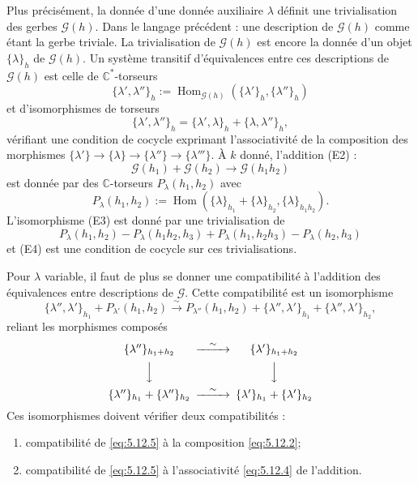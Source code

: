 \documentclass[12pt,a4paper]{article}
\theoremstyle{plain}
\theoremstyle{definition}
\theoremstyle{remark}
\DeclareMathOperator{\Hom}{Hom}
\newcommand{\C}{\mathbb{C}}
\providecommand{\Hom}{\operatorname{Hom}}
\begin{document}
Plus précisément, la donnée d'une donnée auxiliaire $\lambda$ définit une trivialisation
des gerbes $\mathscr{G}(h)$. Dans le langage précédent : une description de $\mathscr{G}(h)$ comme étant la
gerbe triviale. La trivialisation de $\mathscr{G}(h)$ est encore la donnée d'un objet $\{\lambda\}_h$ de $\mathscr{G}(h)$.
Un système transitif d'équivalences entre ces descriptions de $\mathscr{G}(h)$ est celle de $\C^*$-torseurs
\begin{equation}\label{eq:5.12.1}
\{\lambda', \lambda''\}_h := \Hom_{\mathscr{G}(h)}(\{\lambda'\}_h, \{\lambda''\}_h)
\end{equation}
et d'isomorphismes de torseurs
\begin{equation}\label{eq:5.12.2}
\{\lambda', \lambda''\}_h = \{\lambda', \lambda\}_h + \{\lambda, \lambda''\}_h,
\end{equation}
vérifiant une condition de cocycle exprimant l'associativité de la composition des morphismes $\{\lambda'\} \to \{\lambda\} \to \{\lambda''\} \to \{\lambda'''\}$. À $k$ donné, l'addition (E2) :
\[
\mathscr{G}(h_1) + \mathscr{G}(h_2) \to \mathscr{G}(h_1 h_2)
\]
est donnée par des $\C$-torseurs $P_\lambda(h_1, h_2)$ avec
\begin{equation}\label{eq:5.12.3}
P_\lambda(h_1, h_2) := \Hom(\{\lambda\}_{h_1} + \{\lambda\}_{h_2}, \{\lambda\}_{h_1 h_2}).
\end{equation}
L'isomorphisme (E3) est donné par une trivialisation de
\begin{equation}\label{eq:5.12.4}
P_\lambda(h_1, h_2) - P_\lambda(h_1 h_2, h_3) + P_\lambda(h_1, h_2 h_3) - P_\lambda(h_2, h_3)
\end{equation}
et (E4) est une condition de cocycle sur ces trivialisations.

Pour $\lambda$ variable, il faut de plus se donner une compatibilité à l'addition des équivalences entre descriptions de $\mathscr{G}$. Cette compatibilité est un isomorphisme
\begin{equation}\label{eq:5.12.5}
\{\lambda'', \lambda'\}_{h_1} + P_{\lambda'}(h_1, h_2) \xrightarrow{\sim} P_{\lambda''}(h_1, h_2) + \{\lambda'', \lambda'\}_{h_1} + \{\lambda'', \lambda'\}_{h_2},
\end{equation}
reliant les morphismes composés
\[
\begin{CD}
\{\lambda''\}_{h_1 + h_2} @>{\sim}>> \{\lambda'\}_{h_1 + h_2} \\
@VVV @VVV \\
\{\lambda''\}_{h_1} + \{\lambda''\}_{h_2} @>{\sim}>> \{\lambda'\}_{h_1} + \{\lambda'\}_{h_2}
\end{CD}
\]
Ces isomorphismes doivent vérifier deux compatibilités :
\begin{enumerate}[label=\alph*)]
\item compatibilité de \eqref{eq:5.12.5} à la composition \eqref{eq:5.12.2};
\item compatibilité de \eqref{eq:5.12.5} à l'associativité \eqref{eq:5.12.4} de l'addition.
\end{enumerate}
\end{document}
